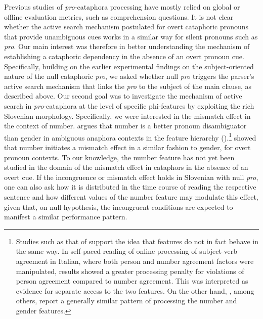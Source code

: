 \documentclass[output=paper,colorlinks,citecolor=brown]{langscibook}
\begin{document}
\begin{sloppypar}
Previous studies of \textit{pro}-cataphora processing have mostly relied on global or offline evaluation metrics, such as comprehension questions. It is not clear whether the active search mechanism postulated for overt cataphoric pronouns that provide unambiguous cues works in a similar way for silent pronouns such as \textit{pro}. Our main interest was therefore in better understanding the mechanism of establishing a cataphoric dependency in the absence of an overt pronoun cue. Specifically, building on the earlier experimental findings on the subject-oriented nature of the null cataphoric \textit{pro}, we asked whether null \textit{pro} triggers the parser’s active search mechanism that links the \textit{pro} to the subject of the main clause, as described above. Our second goal was to investigate the mechanism of active search in \textit{pro}-cataphora at the level of specific phi-features by exploiting the rich Slovenian morphology. Specifically, we were interested in the mismatch effect in the context of number. \citet{carminati2002, carminati2005} argues that number is a better pronoun disambiguator than gender in ambiguous anaphora contexts in the feature hierarchy (\citealt{Greenberg1963, silverstein1985}).\footnote{Studies such as that of \citet{mancini2014} support the idea that features do not in fact behave in the same way. In self-paced reading of online processing of subject-verb agreement in Italian, where both person and number agreement factors were manipulated, results showed a greater processing penalty for violations of person agreement compared to number agreement. This was interpreted as evidence for separate access to the two features. On the other hand, \citet{vanGompelLiversedge2003}, among others, report a generally similar pattern of processing the number and gender features.} \citet{vanGompelLiversedge2003} showed that number initiates a mismatch effect in a similar fashion to gender, for overt pronoun contexts. To our knowledge, the number feature has not yet been studied in the domain of the mismatch effect in cataphors in the absence of an overt cue. If the incongruence or mismatch effect holds in Slovenian with null \textit{pro}, one can also ask how it is distributed in the time course of reading the respective sentence and how different values of the number feature may modulate this effect, given that, on null hypothesis, the incongruent conditions are expected to manifest a similar performance pattern.
\end{sloppypar}
\end{document}
